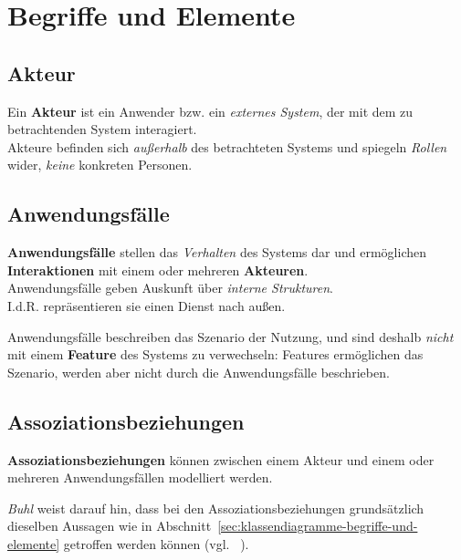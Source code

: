 \section{Begriffe und Elemente}

\subsection{Akteur}

Ein \textbf{Akteur} ist ein Anwender {bzw.} ein \textit{externes System}, der mit dem zu betrachtenden System interagiert.\\

\noindent
Akteure befinden sich \textit{außerhalb} des betrachteten Systems und spiegeln \textit{Rollen} wider, \textit{keine} konkreten Personen.


\subsection{Anwendungsfälle}
\textbf{Anwendungsfälle} stellen das \textit{Verhalten} des Systems dar und ermöglichen \textbf{Interaktionen} mit einem oder mehreren \textbf{Akteuren}.\\

\noindent
Anwendungsfälle geben  Auskunft über \textit{interne Strukturen}.\\
I.d.R. repräsentieren sie einen Dienst nach außen.\\

\begin{tcolorbox}
Anwendungsfälle beschreiben das Szenario der Nutzung, und sind deshalb \textit{nicht} mit einem \textbf{Feature} des Systems zu verwechseln: Features ermöglichen das Szenario, werden aber nicht durch die Anwendungsfälle beschrieben.
\end{tcolorbox}


\subsection{Assoziationsbeziehungen}

\begin{tcolorbox}
\textbf{Assoziationsbeziehungen} können zwischen einem Akteur und einem oder mehreren Anwendungsfällen modelliert werden.
\end{tcolorbox}

\noindent
\textit{Buhl} weist darauf hin, dass bei den Assoziationsbeziehungen grundsätzlich dieselben Aussagen wie in Abschnitt~\ref{sec:klassendiagramme-begriffe-und-elemente} getroffen werden können (vgl. ~\cite[52]{Buh09}).\\

